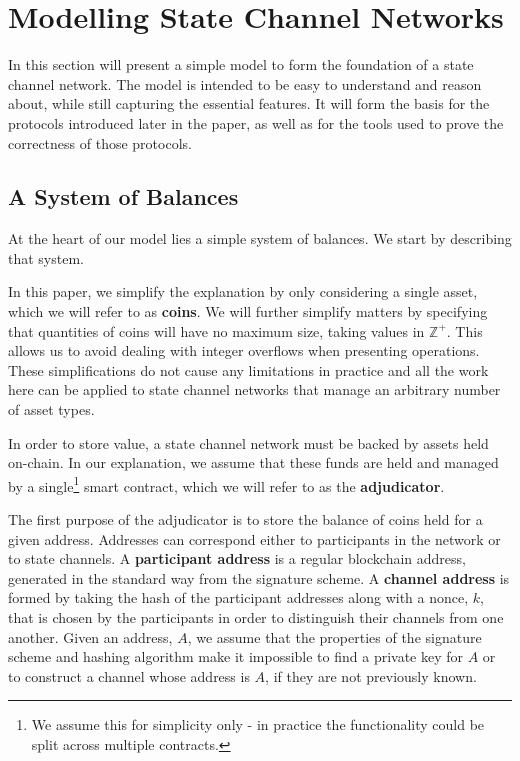 
\section{Modelling State Channel Networks}

In this section will present a simple model to form the foundation of a state channel network.
The model is intended to be easy to understand and reason about, while still capturing the essential features.
It will form the basis for the protocols introduced later in the paper, as well as for the tools used to prove the correctness of those protocols.

\subsection{A System of Balances}

At the heart of our model lies a simple system of balances. 
We start by describing that system.

In this paper, we simplify the explanation by only considering a single asset, which we will refer to as \textbf{coins}.
We will further simplify matters by specifying that quantities of coins will have no maximum
size, taking values in $\mathbb{Z}^+$.
This allows us to avoid dealing with integer overflows when presenting operations.
These simplifications do not cause any limitations in practice and all the work
here can be applied to state channel networks that manage an arbitrary number of asset types.

In order to store value, a state channel network must be backed by assets held on-chain.
In our explanation, we assume that these funds are held and managed by a single\footnote{
  We assume this for simplicity only - in practice the functionality could be split across multiple contracts.
} smart contract,
which we will refer to as the \textbf{adjudicator}.

The first purpose of the adjudicator is to store the balance of coins held for a given address.
Addresses can correspond either to participants in the network or to state channels.
A \textbf{participant address} is a regular blockchain address, generated in the standard way from the signature scheme.
A \textbf{channel address} is formed by taking the hash of the participant addresses along with a nonce, $k$, that is chosen by the participants in order to distinguish their channels from one another.
Given an address, $A$, we assume that the properties of the signature scheme and hashing algorithm make it impossible to find a private key for $A$ or to construct a channel whose address is $A$, if they are not previously known.

